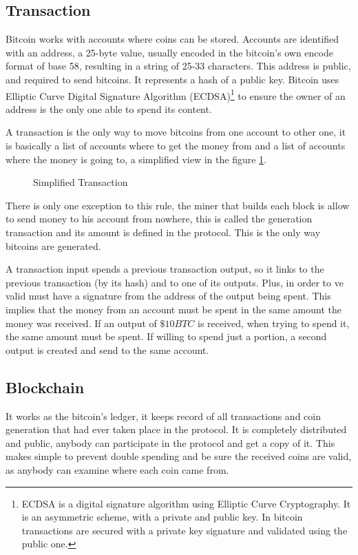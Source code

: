   \subsection{Transaction}\label{subsec:Transaction}
Bitcoin works with accounts where coins can be stored. Accounts are identified
  with an address, a 25-byte value, usually encoded in the bitcoin's own encode
  format of base 58, resulting in a string of 25-33 characters.
This address is public, and required to send bitcoins. It represents a hash of
  a public key. Bitcoin uses Elliptic Curve Digital Signature Algorithm
  (ECDSA)\footnote{ECDSA is a digital signature algorithm using Elliptic Curve
  Cryptography. It is an asymmetric scheme, with a private and public key. In
  bitcoin transactions are secured with a private key signature and validated
  using the public one.} to ensure the owner of an address is the only one able
  to spend its content.

A transaction is the only way to move bitcoins from one account to other one,
  it is basically a list of accounts where to get the money from and a list
  of accounts where the money is going to, a simplified view in the figure
  \ref{fig:simplified_transaction}.

\begin{figure}
	\centering
	
	\caption{Simplified Transaction}
	\label{fig:simplified_transaction}
\end{figure}

There is only one exception to this rule, the miner that builds each block is
  allow to send money to his account from nowhere, this is called the generation
  transaction and its amount is defined in the protocol.
This is the only way bitcoins are generated.

A transaction input spends a previous transaction output, so it links to the
  previous transaction (by its hash) and to one of its outputs. Plus, in order
  to ve valid must have a signature from the address of the output being spent.
This implies that the money from an account must be spent in the same amount
  the money was received. If an output of $\$ 10BTC$ is received, when trying
  to spend it, the same amount must be spent. If willing to spend just a
  portion, a second output is created and send to the same account.

\subsection{Blockchain}
It works as the bitcoin's ledger, it keeps record of all
  transactions and coin generation that had ever taken place in the protocol.
It is completely distributed and public, anybody can participate in the
  protocol and get a copy of it. This makes simple to prevent double spending
  and be sure the received coins are valid, as anybody can examine where each
  coin came from.

